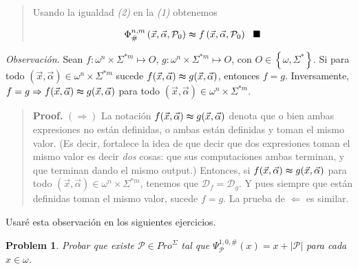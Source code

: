 \documentclass[a4paper, 12pt]{article}
\newtheorem{problem}{Problem}
\newtheorem{problem}{Problem}
\begin{document}
\begin{quote}
\begin{quote}
    \end{quote}

    Usando la igualdad \textit{(2)} en la \textit{(1)} obtenemos
    
    \begin{equation}
        \Phi_{\#}^{n, m}\left( \vec{x},
    \vec{\alpha}, \mathcal{P}_0\right) 
            \thickapprox   f\left(\vec{x}, \vec{\alpha}, \mathcal{P}_0\right)
            ~ ~ \blacksquare
    \end{equation}



\end{quote}
\normalsize

\pagebreak 
\textit{Observación.} Sean $f : \omega^{n} \times \Sigma^{*m} \mapsto O$, $g :
\omega^{n} \times \Sigma^{*m} \mapsto  O$, con $O \in \left\{ \omega, \Sigma^{*}
\right\}$. Si para todo $(\vec{x}, \vec{\alpha}) \in \omega^{n} \times
\Sigma^{*m} $ sucede $f(\vec{x},
\vec{\alpha}) \thickapprox g(\vec{x}, \vec{\alpha})$, entonces $ f =
g$. Inversamente, $f = g \Rightarrow f(\vec{x}, \vec{\alpha}) \thickapprox
g(\vec{x}, \vec{\alpha}) $ para todo $(\vec{x}, \vec{\alpha}) \in \omega^{n}
\times \Sigma^{*m} $.


\small
\begin{quote}

\textbf{Proof.} $(\Rightarrow)$ La notación $f(\vec{x}, \vec{\alpha}) \thickapprox g(\vec{x},
\vec{\alpha}) $ denota que o bien ambas expresiones no están definidas, o ambas están
definidas y toman el mismo valor. (Es decir, fortalece la idea de que decir que
dos expresiones toman el mismo valor es decir \textit{dos} cosas: que
sus computaciones ambas terminan, y que
terminan dando el mismo output.) Entonces, si $f(\vec{x}, \vec{\alpha})
\thickapprox g(\vec{x}, \vec{\alpha}) $ para todo $(\vec{x}, \vec{\alpha}) \in
\omega^{n} \times \Sigma^{*m} $, tenemos que $\mathcal{D}_f = \mathcal{D}_g$. Y
pues siempre que están definidas toman el mismo valor, sucede $f =g $. La prueba
de $\Leftarrow$ es similar.

\end{quote}
\normalsize

Usaré esta observación en los siguientes ejercicios.

\pagebreak


\begin{problem}
    Probar que existe $\mathcal{P} \in Pro^{\Sigma}$ tal que
    $\Psi_{\mathcal{P}}^{1, 0, \#}(x) = x + |\mathcal{P}|$ para cada $x \in
    \omega$.
\end{problem}
\end{document}
